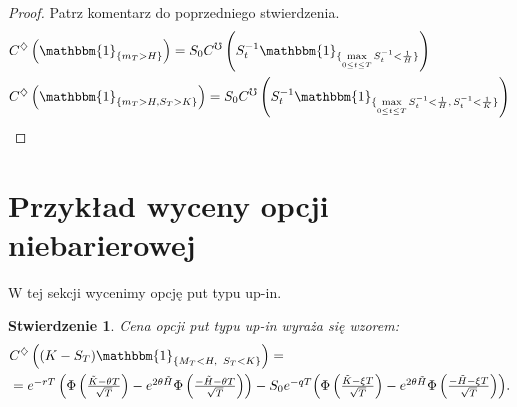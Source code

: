 \documentclass[11pt]{report}
\newtheorem{stw}{Stwierdzenie}[chapter]
\newcommand*{\Scale}[2][4]{\scalebox{#1}{$#2$}}%
\begin{document}
\begin{proof} Patrz komentarz do poprzedniego stwierdzenia.
\begin{multline*}
\begin{split}
& C^{\diamondsuit}\left(\mathbbm{1}_{\{ m_T > H \}}\right) = S_0 C^{\mho}\left( S_t^{-1} \mathbbm{1}_{\{ \max\limits_{0 \le t \le T} S_t^{-1} < \frac{1}{H} \}} \right) \\
& C^{\diamondsuit}\left(\mathbbm{1}_{\{ m_T > H, S_T > K \}}\right)  = S_0 C^{\mho}\left(S_t^{-1} \mathbbm{1}_{\{ \max\limits_{0 \le t \le T} S_t^{-1} < \frac{1}{H},\, S_t^{-1} < \frac{1}{K} \}}\right) 
\end{split}
\end{multline*}
\end{proof}

\section{Przykład wyceny opcji niebarierowej}
W tej sekcji wycenimy opcję put typu up-in. \\
\begin{stw} Cena opcji put typu up-in wyraża się wzorem:
\begin{multline*}
\begin{split}
& C^{\diamondsuit} \left( (K - S_T)\mathbbm{1}_{ \{M_T < H, \hspace{0.15 cm} S_T < K \} } \right) = \\ & =  \Scale[1.0]{e^{-rT}\left(\Phi \left(\frac{ \tilde{K}-\theta T }{\sqrt{T}}\right) - e^{2 \theta \tilde{H}}\Phi\left( \frac{ -\tilde{H}-\theta T }{\sqrt{T}}\right)  \right)} - \Scale[1.0]{S_0 e^{-qT} \Scale[1.0]{\left(\Phi\left(\frac{ \tilde{K} - \xi T }{\sqrt{T}}\right) - e^{2 \theta \tilde{H}}\Phi\left(\frac{ -\tilde{H}-\xi T }{\sqrt{T}}\right) \right)} }.
\end{split}
\end{multline*}
\end{stw}
\end{document}
